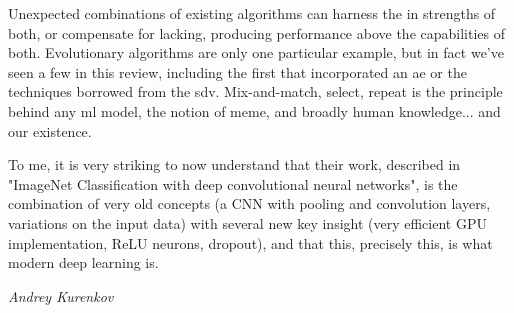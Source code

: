 \footnotesize
{}
\begin{tcolorbox}[arc=0mm, 
    colback=cadmiumgreen!10!white, 
    coltext=cadmiumgreen!90!black,  
    colframe=cadmiumgreen!90!black,
    colbacktitle=cadmiumgreen!80,
    leftrule=3mm,
    rightrule=0mm, 
    toprule=0mm, 
    bottomrule=0mm, 
    box align=top]

Unexpected combinations of existing algorithms can harness the in strengths of both, or compensate for lacking, producing performance above the capabilities of both. Evolutionary algorithms are only one particular example, but in fact we've seen a few in this review, including the first that incorporated an \gls{ae} or the techniques borrowed from the \gls{sdv}. Mix-and-match, select, repeat is the principle behind any \gls{ml} model, the notion of meme, and broadly human knowledge... and our existence.
\end{tcolorbox}
\hfill
\begin{tcolorbox}[tcbox width=auto, 
    arc=0mm, 
    colback=white, 
    coltext=cadmiumgreen, 
    boxrule=0pt, 
    colframe=white,
    box align=top]
    
\epigraph{To me, it is very striking to now understand that their work, described in "ImageNet Classification with deep convolutional neural networks", is the combination of very old concepts (a CNN with pooling and convolution layers, variations on the input data) with several new key insight (very efficient GPU implementation, ReLU neurons, dropout), and that this, precisely this, is what modern deep learning is.}{\textit{Andrey Kurenkov \cite{kurenkov2020briefhistory}}}

\end{tcolorbox}
\normalsize